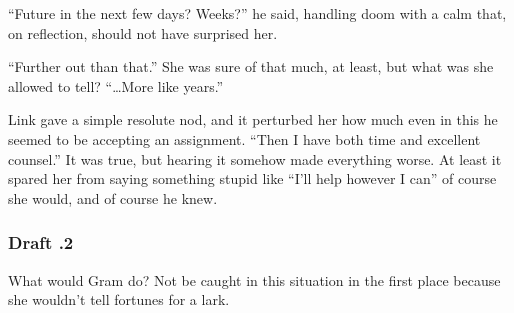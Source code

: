 \documentclass[../FGP.tex]{subfiles}
\begin{document}
\begin{fragment}
``Future in the next few days? Weeks?'' he said, handling doom with a calm that, on reflection, should not have surprised her.

``Further out than that.'' She was sure of that much, at least, but what was she allowed to tell? ``\ldots More like years.''

Link gave a simple resolute nod, and it perturbed her how much even in this he seemed to be accepting an assignment. 
``Then I have both time and excellent counsel.'' 
It was true, but hearing it somehow made everything worse. At least it spared her from saying something stupid like ``I'll help however I can'' of course she would, and of course he knew.

\subsubsection{Draft \thefragment.2}
What would Gram do? Not be caught in this situation in the first place because she wouldn't tell fortunes for a lark. 
\end{fragment}
\end{document}
